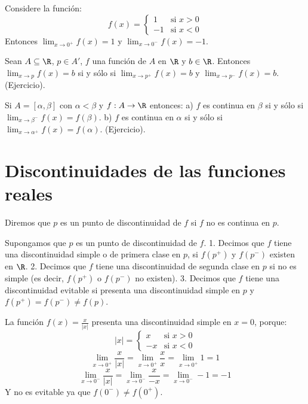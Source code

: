 \begin{example} %
Considere la función:
$$ f(x) = \begin{cases} 1 & \text{si } x > 0 \\ -1 & \text{si } x < 0 \end{cases} $$ %
Entonces $\lim_{x \to 0^+} f(x) = 1$ y $\lim_{x \to 0^-} f(x) = -1$. %
\end{example}

\begin{teorema} %
Sean $A \subseteq \R$, $p \in A'$, $f$ una función de $A$ en $\R$ y $b \in \R$. %
Entonces $\lim_{x \to p} f(x) = b$ si y sólo si $\lim_{x \to p^+} f(x) = b$ y $\lim_{x \to p^-} f(x) = b$. (Ejercicio). %
\end{teorema}

\begin{teorema} %
Si $A = [\alpha, \beta]$ con $\alpha < \beta$ y $f: A \to \R$ entonces: %
a) $f$ es continua en $\beta$ si y sólo si $\lim_{x \to \beta^-} f(x) = f(\beta)$. %
b) $f$ es continua en $\alpha$ si y sólo si $\lim_{x \to \alpha^+} f(x) = f(\alpha)$. (Ejercicio). %
\end{teorema}

\section*{Discontinuidades de las funciones reales} %

\begin{definicion} %
Diremos que $p$ es un punto de discontinuidad de $f$ si $f$ no es continua en $p$. %
\end{definicion}

\begin{definicion} %
Supongamos que $p$ es un punto de discontinuidad de $f$. %
1. Decimos que $f$ tiene una discontinuidad simple o de primera clase en $p$, si $f(p^+)$ y $f(p^-)$ existen en $\R$. %
2. Decimos que $f$ tiene una discontinuidad de segunda clase en $p$ si no es simple (es decir, $f(p^+)$ o $f(p^-)$ no existen). %
3. Decimos que $f$ tiene una discontinuidad evitable si presenta una discontinuidad simple en $p$ y $f(p^+) = f(p^-) \neq f(p)$. %
\end{definicion}

\begin{example} %
La función $f(x) = \frac{x}{|x|}$ presenta una discontinuidad simple en $x=0$, porque: %
$$ |x| = \begin{cases} x & \text{si } x > 0 \\ -x & \text{si } x < 0 \end{cases} $$ %
$$ \lim_{x \to 0^+} \frac{x}{|x|} = \lim_{x \to 0^+} \frac{x}{x} = \lim_{x \to 0^+} 1 = 1 $$ %
$$ \lim_{x \to 0^-} \frac{x}{|x|} = \lim_{x \to 0^-} \frac{x}{-x} = \lim_{x \to 0^-} -1 = -1 $$ %
Y no es evitable ya que $f(0^-) \neq f(0^+)$. %
\end{example}

